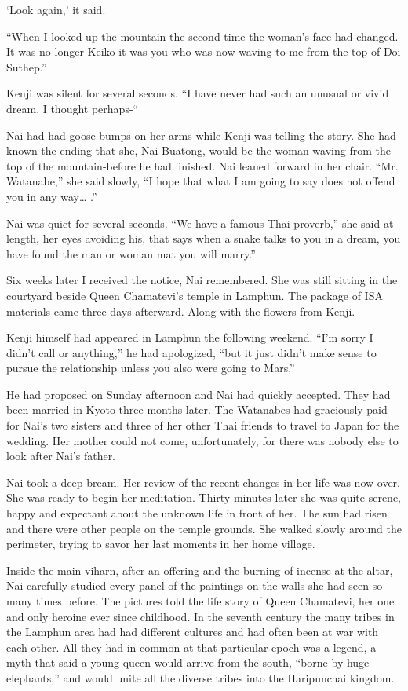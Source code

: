 \documentclass[]{article}
\begin{document}
{‘Look again,’ it said.

“When I looked up the mountain the second time the woman’s face had changed. It was no longer Keiko-it was you who was now waving to me from the top of Doi Suthep.”

Kenji was silent for several seconds. “I have never had such an unusual or vivid dream. I thought perhaps-“

Nai had had goose bumps on her arms while Kenji was telling the story. She had known the ending-that she, Nai Buatong, would be the woman waving from the top of the mountain-before he had finished. Nai leaned forward in her chair. “Mr. Watanabe,” she said slowly, “I hope that what I am going to say does not offend you in any way… .”

Nai was quiet for several seconds. “We have a famous Thai proverb,” she said at length, her eyes avoiding his, that says when a snake talks to you in a dream, you have found the man or woman mat you will marry.”

Six weeks later I received the notice, Nai remembered. She was still sitting in the courtyard beside Queen Chamatevi’s temple in Lamphun. The package of ISA materials came three days afterward. Along with the flowers from Kenji.

Kenji himself had appeared in Lamphun the following weekend. “I’m sorry I didn’t call or anything,” he had apologized, “but it just didn’t make sense to pursue the relationship unless you also were going to Mars.”

He had proposed on Sunday afternoon and Nai had quickly accepted. They had been married in Kyoto three months later. The Watanabes had graciously paid for Nai’s two sisters and three of her other Thai friends to travel to Japan for the wedding. Her mother could not come, unfortunately, for there was nobody else to look after Nai’s father.

Nai took a deep bream. Her review of the recent changes in her life was now over. She was ready to begin her meditation. Thirty minutes later she was quite serene, happy and expectant about the unknown life in front of her. The sun had risen and there were other people on the temple grounds. She walked slowly around the perimeter, trying to savor her last moments in her home village.

Inside the main viharn, after an offering and the burning of incense at the altar, Nai carefully studied every panel of the paintings on the walls she had seen so many times before. The pictures told the life story of Queen Chamatevi, her one and only heroine ever since childhood. In the seventh century the many tribes in the Lamphun area had had different cultures and had often been at war with each other. All they had in common at that particular epoch was a legend, a myth that said a young queen would arrive from the south, “borne by huge elephants,” and would unite all the diverse tribes into the Haripunchai kingdom.

}
\end{document}
